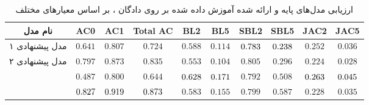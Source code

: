 \begin{table}[!htb]
    \centering
	\caption{
    ارزیابی مدل‌های پایه و ارائه شده آموزش داده شده بر روی دادگان ، بر اساس معیار‌های مختلف}
\label{table:mr15_result}
    \small\tabcolsep=0.07cm
    \begin{tabular}{||c||c c c|c c|c c|c c||}\hline\hline نام مدل	& AC0	& AC1	& Total AC	& BL2	& BL5	& SBL2	& SBL5	& JAC2	& JAC5\\
        \hline\hline
        مدل پیشنهادی ۱
        	& $0.641$	& $0.807$	& $0.724$	& $0.588$	& $0.114$	& $\cellcolor{gray!25}0.783$	& $\cellcolor{gray!25}0.238$	& $0.252$	& $0.036$ \\
        \hline
        مدل پیشنهادی ۲
        	& $0.797$	& $0.873$	& $0.835$	& $0.553$	& $0.104$	& $0.805$	& $0.296$	& $0.224$	& $0.028$ \\
        \hline
        \towardctg{}	& $0.487$	& $0.800$	& $0.644$	& $\cellcolor{gray!25}0.628$	& $\cellcolor{gray!25}0.171$	& $0.792$	& $0.508$	& $\cellcolor{gray!25}0.263$	& $\cellcolor{gray!25}0.045$ \\
        \hline
        \sentigan{}	& $\cellcolor{gray!25}0.827$	& $\cellcolor{gray!25}0.919$	& $\cellcolor{gray!25}0.873$	& $0.583$	& $0.155$	& $0.799$	& $0.587$	& $0.228$	& $0.035$ \\
        \hline
        \hline\end{tabular}\normalsize 
\end{table}


